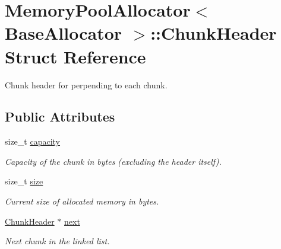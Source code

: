 \hypertarget{struct_memory_pool_allocator_1_1_chunk_header}{}\section{Memory\+Pool\+Allocator$<$ Base\+Allocator $>$\+:\+:Chunk\+Header Struct Reference}
\label{struct_memory_pool_allocator_1_1_chunk_header}


Chunk header for perpending to each chunk.  


\subsection*{Public Attributes}
\begin{DoxyCompactItemize}
\item 
size\+\_\+t \hyperlink{struct_memory_pool_allocator_1_1_chunk_header_ae19df98bce5dd485a23f953112ecde5f}{capacity}\hypertarget{struct_memory_pool_allocator_1_1_chunk_header_ae19df98bce5dd485a23f953112ecde5f}{}\label{struct_memory_pool_allocator_1_1_chunk_header_ae19df98bce5dd485a23f953112ecde5f}

\begin{DoxyCompactList}\small\item\em Capacity of the chunk in bytes (excluding the header itself). \end{DoxyCompactList}\item 
size\+\_\+t \hyperlink{struct_memory_pool_allocator_1_1_chunk_header_ac9f3868f4cd36cdb7c712c9a48686680}{size}\hypertarget{struct_memory_pool_allocator_1_1_chunk_header_ac9f3868f4cd36cdb7c712c9a48686680}{}\label{struct_memory_pool_allocator_1_1_chunk_header_ac9f3868f4cd36cdb7c712c9a48686680}

\begin{DoxyCompactList}\small\item\em Current size of allocated memory in bytes. \end{DoxyCompactList}\item 
\hyperlink{struct_memory_pool_allocator_1_1_chunk_header}{Chunk\+Header} $\ast$ \hyperlink{struct_memory_pool_allocator_1_1_chunk_header_a4d24357c177824b3af56ec1098d9d9dc}{next}\hypertarget{struct_memory_pool_allocator_1_1_chunk_header_a4d24357c177824b3af56ec1098d9d9dc}{}\label{struct_memory_pool_allocator_1_1_chunk_header_a4d24357c177824b3af56ec1098d9d9dc}

\begin{DoxyCompactList}\small\item\em Next chunk in the linked list. \end{DoxyCompactList}\end{DoxyCompactItemize}


